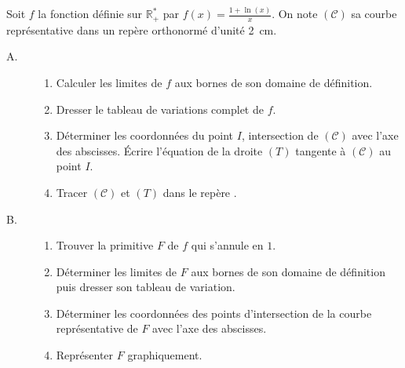 \begin{exo}
Soit $f$ la fonction d\'efinie sur $\mathbb{R}^*_+$ par $f(x) = \frac{1 + \ln (x)}{x}$.
On note $(\mathscr{C})$ sa courbe repr\'esentative dans un rep\`ere orthonorm\'e
\Oij{} d'unit\'e 2~cm.
\begin{description}
\item[A.] \begin{enumerate}
      \item Calculer les limites de $f$ aux bornes de son domaine de d\'efinition.
      \item Dresser le tableau de variations complet de $f$.
      \item D\'eterminer les coordonn\'ees du point $I$, intersection de $(\mathscr{C})$ avec l'axe des abscisses.
            \'Ecrire l'\'equation de la droite $(T)$ tangente \`a $(\mathscr{C})$ au point $I$.
      \item Tracer $(\mathscr{C})$ et $(T)$ dans le rep\`ere \Oij.
      \end{enumerate}
\item[B.] \begin{enumerate}
      \item Trouver la primitive $F$ de $f$ qui s'annule en $1$.
      \item D\'eterminer les limites de $F$ aux bornes de son domaine de d\'efinition puis dresser son tableau de variation.
      \item D\'eterminer les coordonn\'ees des points d'intersection de la courbe repr\'esentative de $F$ avec l'axe des abscisses.
      \item Repr\'esenter $F$ graphiquement. 
      \end{enumerate}
\end{description}
\end{exo}
